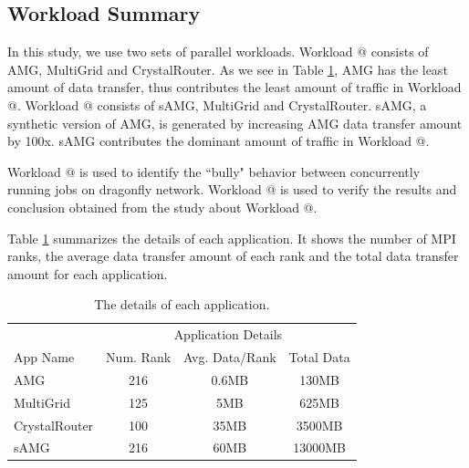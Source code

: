 \documentclass[conference,compsoc]{IEEEtran}
\makeatletter
\newcommand{\Rmnum}[1]{\expandafter\@slowromancap\romannumeral #1@}
\makeatother
\begin{document}
\subsection{Workload Summary}
\label{sec:workload summary}





In this study, we use two sets of parallel workloads. Workload \Rmnum{1} consists of AMG, MultiGrid and CrystalRouter. As we see in Table \ref{tab:apps-detail}, AMG has the least amount of data transfer, thus contributes the least amount of traffic in Workload \Rmnum{1}. Workload \Rmnum{2} consists of sAMG, MultiGrid and CrystalRouter. sAMG, a synthetic version of AMG, is generated by increasing AMG data transfer amount by 100x. sAMG contributes the dominant amount of traffic in Workload \Rmnum{2}. 

Workload \Rmnum{1} is used to identify the ``bully" behavior between concurrently running jobs on dragonfly network. Workload \Rmnum{2} is used to verify the results and conclusion obtained from the study about Workload \Rmnum{1}.

Table \ref{tab:apps-detail} summarizes the details of each application. It shows the number of MPI ranks, the average data transfer amount of each rank and the total data transfer amount for each application.

\begin{table}[ht]
\begin{center}
\caption{The details of each application.} 
\label{tab:apps-detail}
\begin{tabular}{l c c c }
\toprule %
\toprule
&\multicolumn{3}{c}{Application Details} \\ %
\cmidrule(l){2-4}
App Name & Num. Rank & Avg. Data/Rank & Total Data\\ %
\midrule %
AMG  &    216 &   0.6MB   &     130MB\\ %
\midrule
MultiGrid  &    125 &   5MB   &     625MB\\ 
\midrule
CrystalRouter  &   100  &  35MB    &     3500MB\\ 
\midrule
sAMG  &    216 &   60MB   &     13000MB\\ %
\midrule %
\bottomrule %
\end{tabular}
\end{center}
\end{table}
\end{document}
